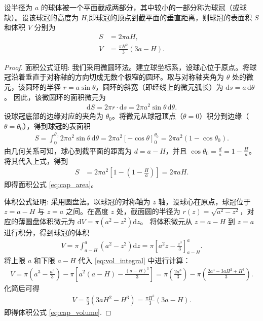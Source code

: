 \documentclass[../../main.tex]{subfiles}%
\begin{document}
\begin{proposition}[球冠面积和体积公式]\label{proposition:球冠面积和体积公式}
设半径为 \(a\) 的球体被一个平面截成两部分，其中较小的一部分称为球冠（或球缺）。设该球冠的高度为 \(H\),即球冠的顶点到截平面的垂直距离，则球冠的表面积 \(S\) 和体积 \(V\) 分别为
\begin{align}
\label{eq:cap_area}
S &= 2\pi a H, \\
\label{eq:cap_volume}
V &= \frac{\pi H^2}{3}(3a - H).
\end{align}
\end{proposition}
\begin{proof}

{\heiti 面积公式证明:} 我们采用微圆环法。建立球坐标系，设球心位于原点。将球冠沿着垂直于对称轴的方向切成无数个极窄的圆环。取与对称轴夹角为 \(\theta\) 处的微元，该圆环的半径 \(r = a\sin\theta\)，圆环的斜宽（即经线上的微元弧长）为 \(\mathrm{d}s = a\,\mathrm{d}\theta\)。
因此，该微圆环的面积微元为
\begin{align*}
\mathrm{d}S = 2\pi r \cdot \mathrm{d}s = 2\pi a^2 \sin\theta \, \mathrm{d}\theta.
\end{align*}
设球冠底部的边缘对应的夹角为 \(\theta_0\)。将微元从球冠顶点（\(\theta=0\)）积分到边缘（\(\theta=\theta_0\)），得到球冠的表面积
\begin{align*}
S = \int_{0}^{\theta_0} 2\pi a^2 \sin\theta \, \mathrm{d}\theta = 2\pi a^2 \left[ -\cos\theta \right]_{0}^{\theta_0} = 2\pi a^2 (1 - \cos\theta_0).
\end{align*}
由几何关系可知，球心到截平面的距离为 \(d = a - H\)，并且 \(\cos\theta_0 = \frac{d}{a} = 1 - \frac{H}{a}\)。将其代入上式，得到
\begin{align*}
S &= 2\pi a^2 \left[ 1 - \left(1 - \frac{H}{a}\right) \right] = 2\pi a H.
\end{align*}
即得面积公式 \eqref{eq:cap_area}。

{\heiti 体积公式证明:} 采用圆盘法。以球冠的对称轴为 \(z\) 轴，设球心在原点，球冠位于 \(z = a-H\) 与 \(z = a\) 之间。在高度 \(z\) 处，截面圆的半径为 \(r(z) = \sqrt{a^2 - z^2}\)，对应的薄圆盘体积微元为 \(\mathrm{d}V = \pi (a^2 - z^2) \mathrm{d}z\)。
将体积微元从 \(z = a-H\) 到 \(z = a\) 进行积分，得到球冠的体积
\begin{align}
V = \pi \int_{a-H}^{a} (a^2 - z^2) \mathrm{d}z = \pi \left[ a^2 z - \frac{z^3}{3} \right]_{a-H}^{a}. \label{eq:vol_integral}
\end{align}
将上限 \(a\) 和下限 \(a-H\) 代入 \eqref{eq:vol_integral} 中进行计算：
\begin{align*}
V = \pi \left( a^3 - \frac{a^3}{3} \right) - \pi \left[ a^2(a-H) - \frac{(a-H)^3}{3} \right] = \pi \left( \frac{2a^3}{3} \right) - \pi \left( \frac{2a^3 - 3aH^2 + H^3}{3} \right).
\end{align*}
化简后可得
\begin{align*}
V = \frac{\pi}{3} (3aH^2 - H^3) = \frac{\pi H^2}{3}(3a - H).
\end{align*}
即得体积公式 \eqref{eq:cap_volume}.
\end{proof}
\end{document}
